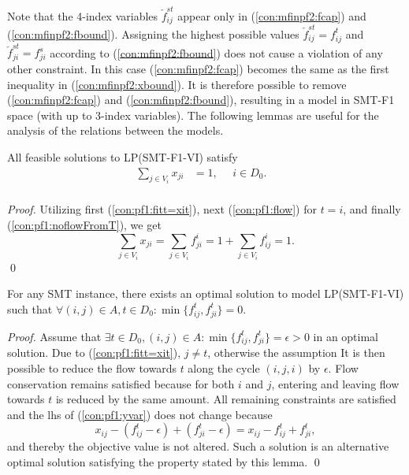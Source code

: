 Note that the 4-index variables $\check{f}^{st}_{ij}$ appear only in (\ref{con:mfinpf2:fcap}) and (\ref{con:mfinpf2:fbound}). Assigning the highest possible values $\check{f}^{st}_{ij}=f^{t}_{ij}$ and $\check{f}^{st}_{ji}=f^{s}_{ji}$ according to (\ref{con:mfinpf2:fbound}) does not cause a violation of any other constraint. In this case (\ref{con:mfinpf2:fcap}) becomes the same as the first inequality in (\ref{con:mfinpf2:xbound}). It is therefore possible to remove (\ref{con:mfinpf2:fcap}) and (\ref{con:mfinpf2:fbound}), resulting in a model in SMT-F1 space (with up to 3-index variables).%
The following lemmas are useful for the analysis of the relations between the models. 
\begin{lemma}
All feasible solutions to LP(SMT-F1-VI) satisfy
\begin{align*}
\sum_{j\in V_i}x_{ji}&=1,~~~~~~ i\in D_0. & \label{eq:sumToD} \tag{A}\\
\end{align*}
\end{lemma}
\begin{proof}
 Utilizing first (\ref{con:pf1:fitt=xit}), next (\ref{con:pf1:flow}) for $t=i$, and finally (\ref{con:pf1:noflowFromT}), we get
$$\sum_{j\in V_i}x_{ji}=\sum_{j\in V_i}f_{ji}^i = 1+\sum_{j\in V_i}f_{ij}^i=1.$$\qed
\end{proof}
\begin{lemma}\label{lem:onedir} For any SMT instance, there exists an optimal solution to model LP(SMT-F1-VI) such that
$\forall (i,j)\in A, t\in D_0: \min\{f_{ij}^t,f_{ji}^t\} = 0.$
\end{lemma}
\begin{proof}
Assume that $\exists t\in D_0, (i,j)\in A: \min\{f_{ij}^t,f_{ji}^t\} = \epsilon> 0$ in an optimal solution. Due to (\ref{con:pf1:fitt=xit}), $j\neq t$, otherwise the assumption    It is then possible to reduce the flow towards $t$ along the cycle $(i,j,i)$ by $\epsilon$. Flow conservation remains satisfied because for both $i$ and $j$, entering and leaving flow towards $t$ is reduced by the same amount. All remaining constraints are satisfied and the lhs of (\ref{con:pf1:yvar}) does not change because 
$$
x_{ij}-(f_{ij}^t-\epsilon)+(f_{ji}^t-\epsilon) = x_{ij}-f_{ij}^t+f_{ji}^t,
$$
and thereby the objective value is not altered. Such a solution is an alternative optimal solution satisfying the property stated by this lemma.  \qed
\end{proof}

